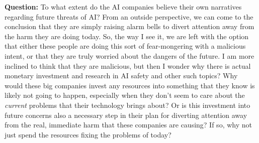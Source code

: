 \textbf{Question:}
To what extent do the AI companies believe their own narratives regarding future threats of AI?
From an outside perspective, we can come to the conclusion that they are simply raising alarm bells to divert attention away from the harm they are doing today.
So, the way I see it, we are left with the option that either these people are doing this sort of fear-mongering with a malicious intent, or that they are truly worried about the dangers of the future.
I am more inclined to think that they are malicious, but then I wonder why there is actual monetary investment and research in AI safety and other such topics?
Why would these big companies invest any resources into something that they know is likely not going to happen, especially when they don't seem to care about the \textit{current} problems that their technology brings about?
Or is this investment into future concerns also a necessary step in their plan for diverting attention away from the real, immediate harm that these companies are causing?
If so, why not just spend the resources fixing the problems of today?